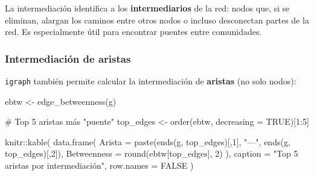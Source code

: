 \documentclass[
  letterpaper,
  DIV=11,
  numbers=noendperiod]{scrreprt}
\newenvironment{Shaded}{\begin{snugshade}}{\end{snugshade}}
\newcommand{\AttributeTok}[1]{\textcolor[rgb]{0.40,0.45,0.13}{#1}}
\newcommand{\CommentTok}[1]{\textcolor[rgb]{0.37,0.37,0.37}{#1}}
\newcommand{\ConstantTok}[1]{\textcolor[rgb]{0.56,0.35,0.01}{#1}}
\newcommand{\DecValTok}[1]{\textcolor[rgb]{0.68,0.00,0.00}{#1}}
\newcommand{\FunctionTok}[1]{\textcolor[rgb]{0.28,0.35,0.67}{#1}}
\newcommand{\NormalTok}[1]{\textcolor[rgb]{0.00,0.23,0.31}{#1}}
\newcommand{\OtherTok}[1]{\textcolor[rgb]{0.00,0.23,0.31}{#1}}
\newcommand{\SpecialCharTok}[1]{\textcolor[rgb]{0.37,0.37,0.37}{#1}}
\newcommand{\StringTok}[1]{\textcolor[rgb]{0.13,0.47,0.30}{#1}}
\begin{document}
\begin{tcolorbox}[enhanced jigsaw, toprule=.15mm, colframe=quarto-callout-tip-color-frame, coltitle=black, titlerule=0mm, colback=white, breakable, leftrule=.75mm, arc=.35mm, bottomtitle=1mm, toptitle=1mm, rightrule=.15mm, bottomrule=.15mm, left=2mm, title=\textcolor{quarto-callout-tip-color}{\faLightbulb}\hspace{0.5em}{💡 Concepto clave}, colbacktitle=quarto-callout-tip-color!10!white, opacityback=0, opacitybacktitle=0.6]

La intermediación identifica a los \textbf{intermediarios} de la red:
nodos que, si se eliminan, alargan los caminos entre otros nodos o
incluso desconectan partes de la red. Es especialmente útil para
encontrar puentes entre comunidades.

\end{tcolorbox}

\subsubsection{Intermediación de
aristas}\label{intermediaciuxf3n-de-aristas}

\texttt{igraph} también permite calcular la intermediación de
\textbf{aristas} (no solo nodos):

\begin{Shaded}
\begin{Highlighting}[]
\NormalTok{ebtw }\OtherTok{\textless{}{-}} \FunctionTok{edge\_betweenness}\NormalTok{(g)}

\CommentTok{\# Top 5 aristas más "puente"}
\NormalTok{top\_edges }\OtherTok{\textless{}{-}} \FunctionTok{order}\NormalTok{(ebtw, }\AttributeTok{decreasing =} \ConstantTok{TRUE}\NormalTok{)[}\DecValTok{1}\SpecialCharTok{:}\DecValTok{5}\NormalTok{]}

\NormalTok{knitr}\SpecialCharTok{::}\FunctionTok{kable}\NormalTok{(}
  \FunctionTok{data.frame}\NormalTok{(}
    \AttributeTok{Arista =} \FunctionTok{paste}\NormalTok{(}\FunctionTok{ends}\NormalTok{(g, top\_edges)[,}\DecValTok{1}\NormalTok{], }\StringTok{"—"}\NormalTok{, }\FunctionTok{ends}\NormalTok{(g, top\_edges)[,}\DecValTok{2}\NormalTok{]),}
    \AttributeTok{Betweenness =} \FunctionTok{round}\NormalTok{(ebtw[top\_edges], }\DecValTok{2}\NormalTok{)}
\NormalTok{  ),}
  \AttributeTok{caption =} \StringTok{"Top 5 aristas por intermediación"}\NormalTok{,}
  \AttributeTok{row.names =} \ConstantTok{FALSE}
\NormalTok{)}
\end{Highlighting}
\end{Shaded}
\end{document}
